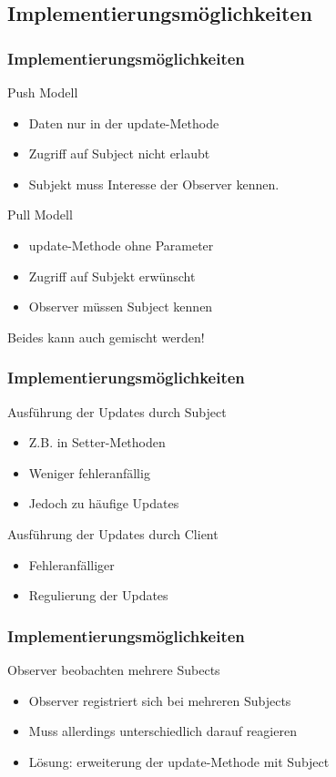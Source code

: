 \subsection{Implementierungsmöglichkeiten}
\begin{frame}
\frametitle{Implementierungsmöglichkeiten}
		\begin{block}{Push Modell}
		  \begin{itemize}
		  	\item Daten nur in der update-Methode
		  	\item Zugriff auf Subject nicht erlaubt
		  	\item Subjekt muss Interesse der Observer kennen.
		  \end{itemize}
  		\end{block}
  		\begin{block}{Pull Modell}
  		 \begin{itemize}
		  	\item update-Methode ohne Parameter
		  	\item Zugriff auf Subjekt erwünscht
		  	\item Observer müssen Subject kennen
		  \end{itemize}  
  		\end{block}
  		Beides kann auch gemischt werden!
\end{frame}

\begin{frame}
\frametitle{Implementierungsmöglichkeiten}
		\begin{block}{Ausführung der Updates durch Subject}
  		 \begin{itemize}
  		 	\item Z.B. in Setter-Methoden
		  	\item Weniger fehleranfällig
		  	\item Jedoch zu häufige Updates
		  \end{itemize}  
  		\end{block}		
  		\begin{block}{Ausführung der Updates durch Client}
		  \begin{itemize}
		  	\item Fehleranfälliger
		  	\item Regulierung der Updates
		  \end{itemize}
  		\end{block}	
\end{frame}

\begin{frame}
\frametitle{Implementierungsmöglichkeiten}
		  \begin{block}{Observer beobachten mehrere Subects}
		  	\begin{itemize}
		  		\item Observer registriert sich bei mehreren Subjects
		  		\item Muss allerdings unterschiedlich darauf reagieren
		  		\item Lösung: erweiterung der update-Methode mit Subject
		  	\end{itemize}
		  \end{block}
\end{frame}

